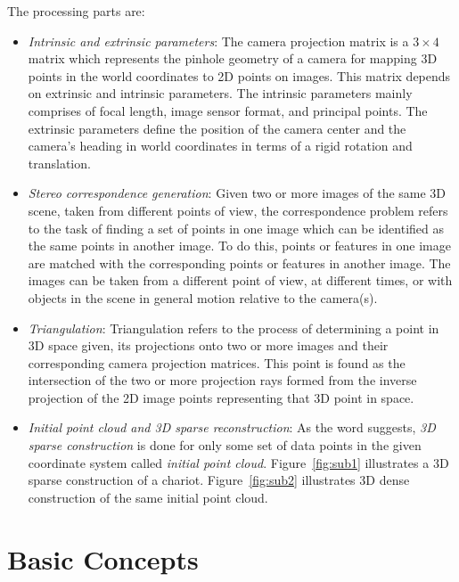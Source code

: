 \documentclass{article}
\begin{document}
		The processing parts are:
			\begin{itemize}
			\item \textit{Intrinsic and extrinsic parameters}: The camera projection matrix is a $3 \times 4$ matrix which represents the pinhole geometry of a camera for mapping 3D points in the world coordinates to 2D points on images. This matrix depends on extrinsic and intrinsic parameters. The intrinsic parameters mainly comprises of focal length, image sensor format, and principal points. The extrinsic parameters define the position of the camera center and the camera's heading in world coordinates in terms of a rigid rotation and translation. 
			\item \textit{Stereo correspondence generation}: Given two or more images of the same 3D scene, taken from different points of view, the correspondence problem refers to the task of finding a set of points in one image which can be identified as the same points in another image. To do this, points or features in one image are matched with the corresponding points or features in another image. The images can be taken from a different point of view, at different times, or with objects in the scene in general motion relative to the camera(s).
			\item \textit{Triangulation}: Triangulation refers to the process of determining a point in 3D space given, its projections onto two or more images and their corresponding camera projection matrices. This point is found as the intersection of the two or more projection rays formed from the inverse projection of the 2D image points representing that 3D point in space.
			\item \textit{Initial point cloud and 3D sparse reconstruction}: As the word suggests, \textit{3D sparse construction} is done for only some set of data points in the given coordinate system called \textit{initial point cloud}. Figure~\ref{fig:sub1} illustrates a 3D sparse construction of a chariot. Figure~\ref{fig:sub2} illustrates 3D dense construction of the same initial point cloud.

			\end{itemize}
	
\section{Basic Concepts} 
\end{document}
